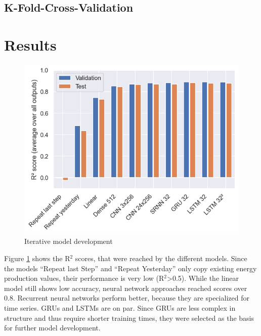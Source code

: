 \documentclass[11pt,table]{article}
\begin{document}
\subsection{K-Fold-Cross-Validation}

\section{Results}
\begin{figure}[H]
	\centering
	\includegraphics[scale=0.6]{Figures/benchmarks.png}
	\caption{Iterative model development}
	\label{fig:benchmarks}
\end{figure} 

Figure \ref{fig:benchmarks} shows the R$^2$ scores, that were reached by the different models. Since the models 
``Repeat last Step'' and 
``Repeat Yesterday''
only copy existing energy production values, their performance is very low (R$^2$>0.5). While the linear model still shows low accuracy, neural network approaches reached scores over 0.8. Recurrent neural networks perform better, because they are specialized for time series. GRUs and LSTMs are on par. Since GRUs are less complex in structure and thus require shorter training times, they were selected as the basis for further model development.
\end{document}
